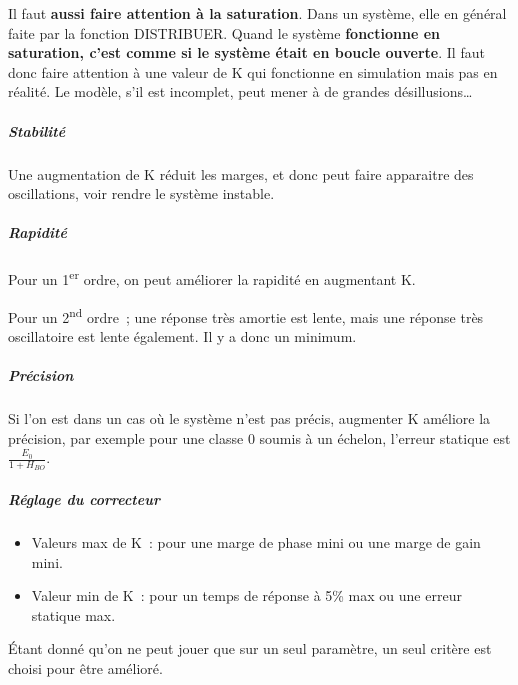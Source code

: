 Il faut \textbf{aussi faire attention à la saturation}. Dans un système, elle en général faite par la fonction DISTRIBUER. Quand le système \textbf{fonctionne en saturation, c'est comme si le système était en boucle ouverte}. Il faut donc faire attention à une valeur de K qui fonctionne en simulation mais pas en réalité. Le modèle, s'il est incomplet, peut mener à de grandes désillusions\ldots{}

\hypertarget{stabilituxe9}{%
\subparagraph*{Stabilité}\label{stabilituxe9}}

Une augmentation de K réduit les marges, et donc peut faire apparaitre des oscillations, voir rendre le système instable.

\hypertarget{rapidituxe9}{%
\subparagraph*{Rapidité}\label{rapidituxe9}}

Pour un 1\textsuperscript{er} ordre, on peut améliorer la rapidité en augmentant K.

Pour un 2\textsuperscript{nd} ordre~; une réponse très amortie est lente, mais une réponse très oscillatoire est lente également. Il y a donc un minimum.

\hypertarget{pruxe9cision}{%
\subparagraph*{Précision}\label{pruxe9cision}}

Si l'on est dans un cas où le système n'est pas précis, augmenter K améliore la précision, par exemple pour une classe 0 soumis à un échelon, l'erreur statique est \(\frac{E_{0}}{1 + H_{BO}}\).

\hypertarget{ruxe9glage-du-correcteur}{%
\subparagraph*{Réglage du correcteur}\label{ruxe9glage-du-correcteur}}

\begin{itemize}
\item
  Valeurs max de K~: pour une marge de phase mini ou une marge de gain mini.
\item
  Valeur min de K~: pour un temps de réponse à 5\% max ou une erreur statique max.
\end{itemize}

Étant donné qu'on ne peut jouer que sur un seul paramètre, un seul critère est choisi pour être amélioré.

